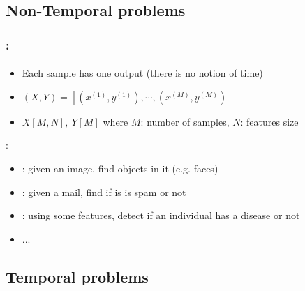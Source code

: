 \documentclass[xcolor=table]{beamer}
\begin{document}
\subsection{Non-Temporal problems}

\begin{frame}
	\frametitle{\insertshortsubtitle: \insertsection}
	\framesubtitle{\insertsubsection}
	
	\begin{itemize}
		\item Each sample has one output (there is no notion of time) 
		\item $ (X, Y)= [(x^{(1)}, y^{(1)}), \cdots, (x^{(M)}, y^{(M)})]$
		\item $ X[M, N],\ Y[M] $ where $ M $: number of samples, $ N $: features size
		
	\end{itemize}
	
	\vfill
	:
	\begin{itemize}
		\item {}: given an image, find objects in it (e.g. faces)  
		\item {}: given a mail, find if is is spam or not
		\item {}: using some features, detect if an individual has a disease or not
		\item...
	\end{itemize}
	
\end{frame}

\subsection{Temporal problems}
\end{document}
